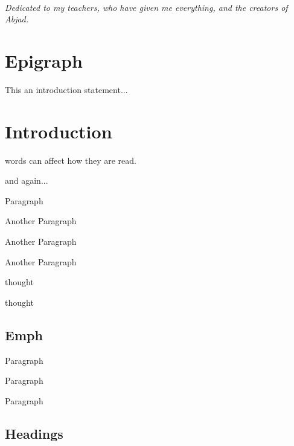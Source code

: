 \documentclass{tufte-book}
\begin{document}
\tableofcontents

\listoffigures

\listoftables

\cleardoublepage
~\vfill
\begin{doublespace}
\noindent\fontsize{18}{22}\selectfont\itshape
\nohyphenation
Dedicated to my teachers, who have given me everything,{} 
and the creators of \mbox{Abjad}.
\end{doublespace}
\vfill
\vfill


\cleardoublepage
\chapter*{Epigraph}

This an introduction statement...


\mainmatter


\chapter{Introduction}
\label{ch:introduction}


 words can affect how they are read.

 and again...

\vspace{-7\baselineskip}
\vspace{7\baselineskip}

\bigskip
Paragraph

Another Paragraph

Another Paragraph

Another Paragraph

 thought
\bigskip

 thought



\section{Emph}\label{sec:label}

Paragraph

Paragraph

Paragraph

\section{Headings}\label{sec:headings1}
\end{document}
